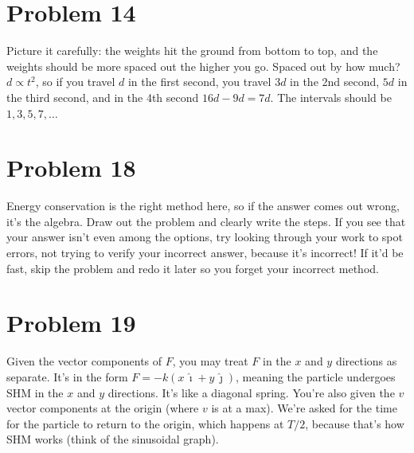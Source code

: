 \documentclass[11pt]{article}
\begin{document}
\section*{Problem 14}
Picture it carefully: the weights hit the ground from bottom to top, and the weights should be more spaced out the higher you go.
Spaced out by how much? $d\propto t^2$, so if you travel $d$ in the first second, you travel $3d$ in the 2nd second, $5d$ in the third second, and in the 4th second $16d-9d=7d$. The intervals should be $1,3,5,7,\ldots$

\begin{center}
\end{center}

\section*{Problem 18}
Energy conservation is the right method here, so if the answer comes out wrong, it's the algebra. Draw out the problem and clearly write the steps.
If you see that your answer isn't even among the options, try looking through your work to spot errors, not trying to verify your incorrect answer, because it's incorrect! If it'd be fast, skip the problem and redo it later so you forget your incorrect method.

\section*{Problem 19}
Given the vector components of $F$, you may treat $F$ in the $x$ and $y$ directions as separate.
It's in the form $F=-k(x\,\hat\imath+y\,\hat\jmath)$, meaning the particle undergoes SHM in the $x$ and $y$ directions. It's like a diagonal spring.
You're also given the $v$ vector components at the origin (where $v$ is at a max).
We're asked for the time for the particle to return to the origin, which happens at $T/2$, because that's how SHM works (think of the sinusoidal graph).
\end{document}
